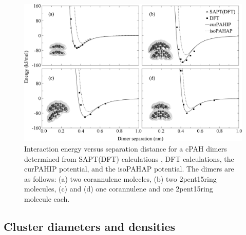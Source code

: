 %
\begin{figure}[!tbh]
\centering
\includegraphics[width=1\linewidth]{Figures/potentialDFT_curves.eps}
\caption{Interaction energy versus separation distance for a cPAH dimers determined from SAPT(DFT) calculations \cite{Cabaleiro-Lago2018}, DFT calculations, the curPAHIP potential, and the isoPAHAP potential. The dimers are as follows: (a) two corannulene molecles, (b) two 2pent15ring molecules, (c) and (d) one corannulene and one 2pent15ring molecule each.}
\label{fig:potentialDFTcurves}
\end{figure}
%

\subsection{Cluster diameters and densities}


